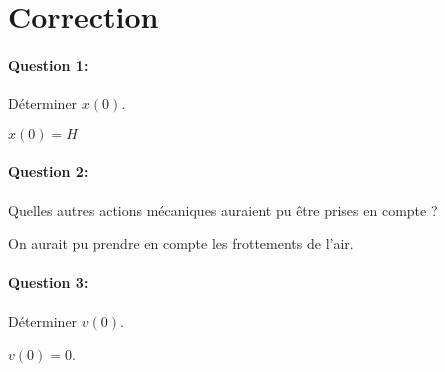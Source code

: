 \clearpage

\ifdef{\public}{}{}

\newpage

\pagestyle{correction}

\section{Correction}

\paragraph{Question 1:} Déterminer $x(0)$.

$x(0)=H$

\paragraph{Question 2:} Quelles autres actions mécaniques auraient pu être prises en compte ?

On aurait pu prendre en compte les frottements de l'air.

\paragraph{Question 3:} Déterminer $v(0)$.

$v(0)=0$.


